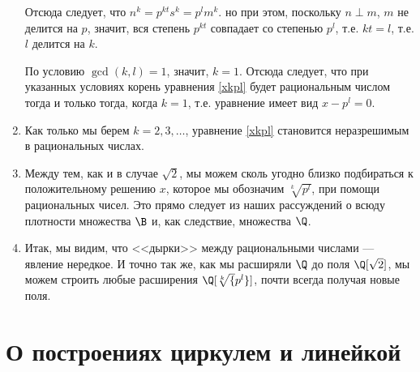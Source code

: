 \begin{enumerate}
Отсюда следует, что $n^k=p^{kt}s^k=p^lm^k$. но при этом, поскольку $n\perp m$, $m$ не делится на $p$, значит, вся степень $p^{kt}$ совпадает со степенью $p^l$, т.е. $kt=l$, т.е. $l$ делится на $k$.

По условию $\gcd(k,l)=1$, значит, $k=1$. Отсюда следует, что при указанных условиях корень уравнения \eqref{xkpl} будет рациональным числом тогда и только тогда, когда $k=1$, т.е. уравнение имеет вид $x-p^l=0$.
\item Как только мы берем $k=2,3,\dots$, уравнение \eqref{xkpl} становится неразрешимым в рациональных числах.
\item Между тем, как и в случае $\sqrt 2$, мы можем сколь угодно близко подбираться к положительному решению $x$, которое мы обозначим $\sqrt[k]{p^l}$, при помощи рациональных чисел. Это прямо следует из наших рассуждений о всюду плотности множества $\B$ и, как следствие, множества $\Q$.
\item Итак, мы видим, что <<дырки>> между рациональными числами --- явление нередкое. И точно так же, как мы расширяли $\Q$ до поля $\Q[\sqrt 2]$, мы можем строить любые расширения $\Q[\sqrt[k]{p^l}]$, почти всегда получая новые поля.
\end{enumerate}



\section{О построениях циркулем и линейкой}



